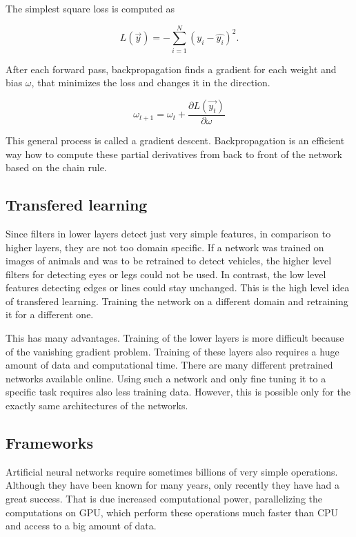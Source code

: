 \documentclass[a4paper,12pt,titlepage, twoside]{article}
\numberwithin{figure}{section}
\begin{document}
The simplest square loss is computed as 

\begin{equation}
 L(\overrightarrow{y}) = - \sum_{i=1}^N(y_i -  \hat{y_i})^2.
\end{equation} 

After each forward pass, backpropagation finds a gradient for each weight and bias $\omega$, that minimizes the loss and changes it in the direction. 

\begin{equation}
\omega_{t + 1} = \omega_{t} + \frac{\partial L(\overrightarrow{y_t})}{\partial \omega}
\end{equation}

This general process is called a gradient descent. Backpropagation is an efficient way how to  compute these partial derivatives from back to front of the network based on the chain rule.

\subsection{Transfered learning}

Since filters in lower layers detect just very simple features, in comparison to higher layers, they are not too domain specific. If a network was trained on images of animals and was to be retrained to detect vehicles, the higher level filters for detecting eyes or legs could not be used. In contrast, the low level features detecting edges or lines could stay unchanged. This is the high level idea of transfered learning. Training the network on a different domain and retraining it for a different one. 

This has many advantages. Training of the lower layers is more difficult because of the vanishing gradient problem. Training of these layers also requires a huge amount of data and computational time. There are many different pretrained networks available online. Using such a network and only fine tuning it to a specific task requires also less training data. However, this is possible only for the exactly same architectures of the networks.

\subsection{Frameworks}
Artificial neural networks require sometimes billions of very simple operations. Although they have been known for many years\cite{widrow199030}, only recently they have had a great success. That is due increased computational power, parallelizing the computations on GPU, which perform these operations much faster than CPU and access to a big amount of data. 
\end{document}
